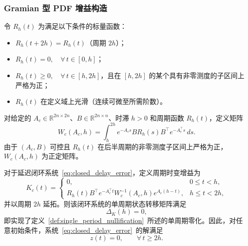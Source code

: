 \subsubsection{Gramian 型 PDF 增益构造}

令 \(R_h(t)\) 为满足以下条件的标量函数：
\begin{itemize}
  \item \(R_h(t+2h)=R_h(t)\)（周期 \(2h\)）；
  \item \(R_h(t)=0,\quad \forall\,t\in[0,h]\)；
  \item \(R_h(t)\ge 0,\quad \forall\,t\in[h,2h]\)，且在 \([h,2h]\) 的某个具有非零测度的子区间上严格为正；
  \item \(R_h(t)\) 在定义域上光滑（连续可微至所需阶数）。
\end{itemize}

\begin{definition}[可控 Gramian]\label{def:gramian}
  对给定的 \(A_c\in\mathbb R^{2n\times2n}\)、\(B\in\mathbb R^{2n\times n}\)、时滞 \(h>0\) 和周期函数 \(R_h(t)\)，定义矩阵
  \begin{equation}
  W_c(A_c,h) = \int_h^{2h} e^{-A_c s} B R_h(s) B^\top e^{-A_c^\top s}\,ds.
  \label{eq:wc_matrix}
  \end{equation}
  由于 \((A_c,B)\) 可控且 \(R_h(t)\) 在后半周期的非零测度子区间上严格为正，\(W_c(A_c,h)\) 为正定矩阵。
\end{definition}

\begin{theorem}\label{thm:pdf_gain}
  对于延迟闭环系统~\eqref{eq:closed_delay_error}，定义周期时变增益为
  \begin{equation}
  K_c(t) = 
  \begin{cases}
  0, & 0\le t < h,\\[4pt]
  R_h(t)B^\top e^{-A_c^\top t} W_c^{-1}(A_c,h) e^{A_c(h-t)}, & h\le t < 2h,
  \end{cases}
  \label{eq:kc_pdf}
  \end{equation}
  并以周期 \(2h\) 延拓。则该闭环系统的单周期状态转移矩阵满足
  \begin{equation}
  \Delta_K(h) = 0,
  \label{eq:single_period_null}
  \end{equation}
  即实现了定义~\ref{def:single_period_nullification}~所述的单周期零化。因此，对任意初始条件，系统~\eqref{eq:closed_delay_error}~的解满足
  \begin{equation}
  z(t) = 0,\qquad \forall\,t\ge 2h.
  \label{eq:pdf_convergence}
  \end{equation}
\end{theorem}

